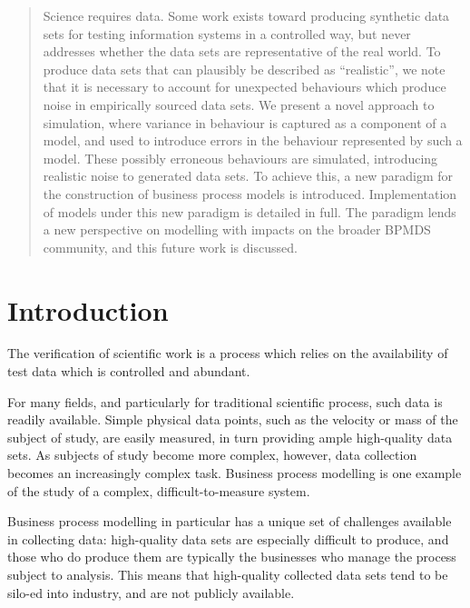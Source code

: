 \documentclass[12pt,draft]{article}
\begin{document}
\maketitle
\begin{abstract}
Science requires data. Some work exists toward producing synthetic data sets
for testing information systems in a controlled way, but never addresses
whether the data sets are representative of the real world. To produce data
sets that can plausibly be described as ``realistic'', we note that it is
necessary to account for unexpected behaviours which produce noise in
empirically sourced data sets. We present a novel approach to simulation,
where variance in behaviour is captured as a component of a model, and used to
introduce errors in the behaviour represented by such a model. These possibly
erroneous behaviours are simulated, introducing realistic noise to generated
data sets. To achieve this, a new paradigm for the construction of business
process models is introduced. Implementation of models under this new paradigm
is detailed in full. The paradigm lends a new perspective on modelling with
impacts on the broader BPMDS community, and this future work is discussed.
\end{abstract}


\section{Introduction}
The verification of scientific work is a process which relies on the
availability of test data which is controlled and abundant.
\par

For many fields, and particularly for traditional scientific process, such data
is readily available. Simple physical data points, such as the velocity or mass
of the subject of study, are easily measured, in turn providing ample
high-quality data sets. As subjects of study become more complex, however, data
collection becomes an increasingly complex task. Business process modelling is
one example of the study of a complex, difficult-to-measure system.
\par

Business process modelling in particular has a unique set of challenges
available in collecting data: high-quality data sets are especially difficult to
produce, and those who do produce them are typically the businesses who manage
the process subject to analysis. This means that high-quality collected data
sets tend to be silo-ed into industry, and are not publicly available.
\par
\end{document}

